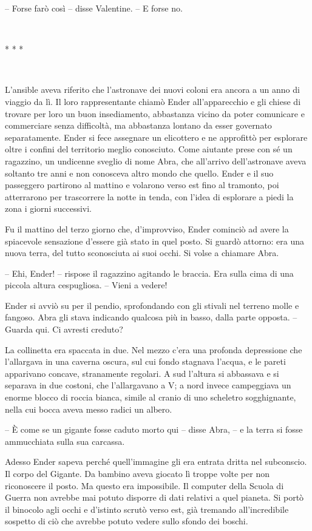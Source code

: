{-- Forse farò così -- disse Valentine. -- E forse no.}

{~}

\begin{center}
	{* * *}
\end{center}

{~}

{L'ansible aveva riferito che l'astronave dei nuovi coloni era ancora a
	un anno di viaggio da lì. Il loro rappresentante chiamò Ender
	all'apparecchio e gli chiese di trovare per loro un buon insediamento,
	abbastanza vicino da poter comunicare e commerciare senza difficoltà, ma
	abbastanza lontano da esser governato separatamente. Ender si fece
	assegnare un elicottero e ne approfittò per esplorare oltre i confini
	del territorio meglio conosciuto. Come aiutante prese con sé un
	ragazzino, un undicenne sveglio di nome Abra, che all'arrivo
	dell'astronave aveva soltanto tre anni e non conosceva altro mondo che
	quello. Ender e il suo passeggero partirono al mattino e volarono verso
	est fino al tramonto, poi atterrarono per trascorrere la notte in tenda,
	con l'idea di esplorare a piedi la zona i giorni successivi.}

{Fu il mattino del terzo giorno che, d'improvviso, Ender cominciò ad
	avere la spiacevole sensazione d'essere già stato in quel posto. Si
	guardò attorno: era una nuova terra, del tutto sconosciuta ai suoi
	occhi. Si volse a chiamare Abra.}

{-- Ehi, Ender! -- rispose il ragazzino agitando le braccia. Era sulla
	cima di una piccola altura cespugliosa. -- Vieni a vedere!}

{Ender si avviò su per il pendio, sprofondando con gli stivali nel
	terreno molle e fangoso. Abra gli stava indicando qualcosa più in basso,
	dalla parte opposta. -- Guarda qui. Ci avresti creduto?}

{La collinetta era spaccata in due. Nel mezzo c'era una profonda
	depressione che l'allargava in una caverna oscura, sul cui fondo
	stagnava l'acqua, e le pareti apparivano concave, stranamente regolari.
	A sud l'altura si abbassava e si separava in due costoni, che
	l'allargavano a V; a nord invece campeggiava un enorme blocco di roccia
	bianca, simile al cranio di uno scheletro sogghignante, nella cui bocca
	aveva messo radici un albero.}

{-- È come se un gigante fosse caduto morto qui -- disse Abra, -- e la
	terra si fosse ammucchiata sulla sua carcassa.}

{Adesso Ender sapeva perché quell'immagine gli era entrata dritta nel
	subconscio. Il corpo del Gigante. Da bambino aveva giocato lì troppe
	volte per non riconoscere il posto. Ma questo era impossibile. Il
	computer della Scuola di Guerra non avrebbe mai potuto disporre di dati
	relativi a quel pianeta. Si portò il binocolo agli occhi e d'istinto
	scrutò verso est, già tremando all'incredibile sospetto di ciò che
	avrebbe potuto vedere sullo sfondo dei boschi.}

